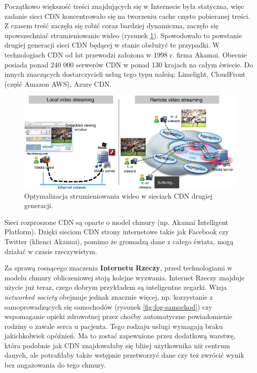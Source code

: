 \documentclass[12pt,a4paper,twoside,titlepage,openright]{book}
\begin{document}
Początkowo większość treści znajdujących się w Internecie była statyczna, więc zadanie sieci CDN koncentrowało się na tworzeniu cache często pobieranej treści. Z czasem treść zaczęła się robić coraz bardziej dynamiczna, zaczęło się upowszechniać strumieniowanie wideo (rysunek \ref{fig:cdn-streaming}). Spowodowało to powstanie drugiej generacji sieci CDN będącej w stanie obsłużyć te przypadki. W technologiach CDN od lat przewodzi założona w 1998 r. firma Akamai. Obecnie posiada ponad 240 000 serwerów CDN w ponad 130 krajach na całym świecie.\cite{siteAkamaiFacts} Do innych znaczących dostarczycieli usług tego typu należą: Limelight, CloudFront (część Amazon AWS), Azure CDN. \cite{ccCambridge, cdn}

\begin{figure}[h]
	\centering
			\includegraphics[resolution=120]{cdn-streaming.jpg}
		\caption{Optymalizacja strumieniowania wideo w sieciach CDN drugiej generacji. \cite{cdn}}
		\label{fig:cdn-streaming}
\end{figure}


Sieci rozproszone CDN są oparte o model chmury (np. Akamai Intelligent Platform). Dzięki sieciom CDN strony internetowe takie jak Facebook czy Twitter (klienci Akamai), pomimo że gromadzą dane z całego świata, mogą działać w czasie rzeczywistym. \cite{ccCambridge}

Za sprawą rosnącego znaczenia \textbf{Internetu Rzeczy}, przed technologiami w modelu chmury obliczeniowej stoją kolejne wyzwania. Internet Rzeczy znajduje użycie już teraz, czego dobrym przykładem są inteligentne zegarki. Wizja \textit{networked society} obejmuje jednak znacznie więcej, np. korzystanie z samoprowadzących się samochodów (rysunek \ref{fig:fog-samochod}) czy wspomaganie opieki zdrowotnej przez choćby automatyczne powiadomienie rodziny o zawale serca u pacjenta. Tego rodzaju usługi wymagają braku jakichkolwiek opóźnień. Ma to zostać zapewnione przez dodatkową warstwę, która podobnie jak CDN znajdowałaby się bliżej użytkownika niż centrum danych, ale potrafiłaby także wstępnie przetworzyć dane czy też zwrócić wynik bez angażowania do tego chmury.
\end{document}
